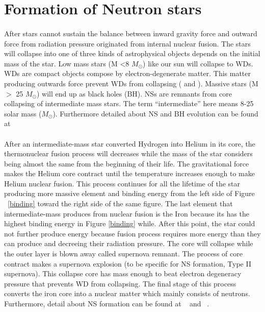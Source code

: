 \documentclass[thesis_msc.tex]{subfiles}
\begin{document}
    \section{Formation of Neutron stars} \label{formation}
    \paragraph{} After stars cannot sustain the balance between inward gravity force and outward force from radiation pressure originated from internal nuclear fusion. The stars will collapse into one of three kinds of astrophysical objects depends on the initial mass of the star. Low mass stars (M \textless 8 $M_\odot$) like our sun will collapse to WDs. WDs are compact objects compose by electron-degenerate matter. This matter producing outwards force prevent WDs from collapsing (\cite{WDNSBH} and \cite{d1997evolution}). Massive stars (M $>$ 25 $M_\odot$) will end up as black holes (BH). NSs are remnants from core collapsing of intermediate mass stars. The term ``intermediate'' here means 8-25 solar mass ($M_\odot$). Furthermore detailed about NS and BH evolution can be found at \cite{heger2003massive}

    \paragraph{} After an intermediate-mass star converted Hydrogen into Helium in its core, the thermonuclear fusion process will decreases while the mass of the star considers being almost the same from the beginning of their life. The gravitational force makes the Helium core contract until the temperature increases enough to make Helium nuclear fusion. This process continues for all the lifetime of the star producing more massive element and binding energy from the left side of Figure ~\ref{binding} toward the right side of the same figure. The last element that intermediate-mass produces from nuclear fusion is the Iron because its has the highest binding energy in Figure \ref{binding} while. After this point, the star could not further produce energy because fusion process requires more energy than they can produce \citep{burbidge1957synthesis} and decreeing their radiation pressure. The core will collapse while the outer layer is blown away called supernova remnant. The process of core contract makes a supernova explosion (to be specific for NS formation, Type II supernova). This collapse core has mass enough to beat electron degeneracy pressure that prevents WD from collapsing. The final stage of this process converts the iron core into a nuclear matter which mainly consists of neutrons. Furthermore, detail about NS formation can be found at ~\citep{cameron1969neutron} and ~\citep{portegies1998formation}. 
\end{document}
